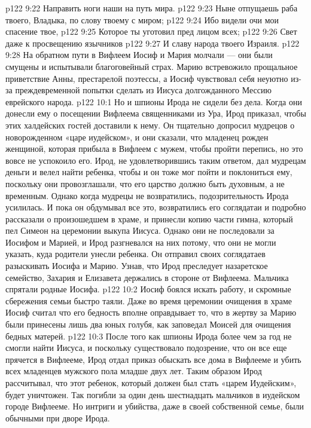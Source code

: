 \vs p122 9:22 Направить ноги наши на путь мира.
\vs p122 9:23 Ныне отпущаешь раба твоего, Владыка, по слову твоему с миром;
\vs p122 9:24 Ибо видели очи мои спасение твое,
\vs p122 9:25 Которое ты уготовил пред лицом всех;
\vs p122 9:26 Свет даже к просвещению язычников
\vs p122 9:27 И славу народа твоего Израиля.
\vs p122 9:28 \pc На обратном пути в Вифлеем Иосиф и Мария молчали --- они были смущены и испытывали благоговейный страх. Марию встревожило прощальное приветствие Анны, престарелой поэтессы, а Иосиф чувствовал себя неуютно из\hyp{}за преждевременной попытки сделать из Иисуса долгожданного Мессию еврейского народа.
\vs p122 10:1 Но и шпионы Ирода не сидели без дела. Когда они донесли ему о посещении Вифлеема священниками из Ура, Ирод приказал, чтобы этих халдейских гостей доставили к нему. Он тщательно допросил мудрецов о новорожденном «царе иудейском», и они сказали, что младенец рожден женщиной, которая прибыла в Вифлеем с мужем, чтобы пройти перепись, но это вовсе не успокоило его. Ирод, не удовлетворившись таким ответом, дал мудрецам деньги и велел найти ребенка, чтобы и он тоже мог пойти и поклониться ему, поскольку они провозглашали, что его царство должно быть духовным, а не временным. Однако когда мудрецы не возвратились, подозрительность Ирода усилилась. И пока он обдумывал все это, возвратились его соглядатаи и подробно рассказали о произошедшем в храме, и принесли копию части гимна, который пел Симеон на церемонии выкупа Иисуса. Однако они не последовали за Иосифом и Марией, и Ирод разгневался на них потому, что они не могли указать, куда родители унесли ребенка. Он отправил своих соглядатаев разыскивать Иосифа и Марию. Узнав, что Ирод преследует назаретское семейство, Захария и Елизавета держались в стороне от Вифлеема. Мальчика спрятали родные Иосифа.
\vs p122 10:2 Иосиф боялся искать работу, и скромные сбережения семьи быстро таяли. Даже во время церемонии очищения в храме Иосиф считал что его бедность вполне оправдывает то, что в жертву за Марию были принесены лишь два юных голубя, как заповедал Моисей для очищения бедных матерей.
\vs p122 10:3 После того как шпионы Ирода более чем за год не смогли найти Иисуса, и поскольку существовало подозрение, что он все еще прячется в Вифлееме, Ирод отдал приказ обыскать все дома в Вифлееме и убить всех младенцев мужского пола младше двух лет. Таким образом Ирод рассчитывал, что этот ребенок, который должен был стать «царем Иудейским», будет уничтожен. Так погибли за один день шестнадцать мальчиков в иудейском городе Вифлееме. Но интриги и убийства, даже в своей собственной семье, были обычными при дворе Ирода.
